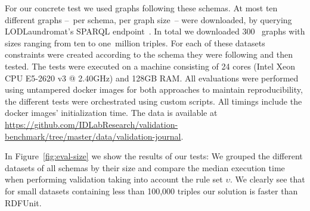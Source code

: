 For our concrete test 
we used graphs following these  schemas.
At most ten different \rdf graphs --~per schema, per \rdf graph size~-- were downloaded,
by querying LODLaundromat's SPARQL endpoint~\cite{beek2014lod}.
In total we downloaded
300~%
graphs with sizes ranging from ten to one~million triples. For each of these datasets constraints were created according to the schema they were following and then tested.
The tests were executed on a  machine consisting of 24 cores (Intel Xeon CPU E5-2620 v3 @ 2.40GHz) and 128GB RAM.
All evaluations were performed using untampered docker images for both approaches to maintain reproducibility,
the different tests were orchestrated using custom scripts.
All timings include the docker images' initialization time.
The data is available at \url{https://github.com/IDLabResearch/validation-benchmark/tree/master/data/validation-journal}.

In Figure~\ref{fig:eval-size} we show the results of our tests: 
We grouped the different datasets of all schemas by their size and compare the median execution time when performing validation taking into account the rule set $\upsilon$.
We clearly see that for small datasets containing less than 100,000 triples our solution is faster than RDFUnit. 



